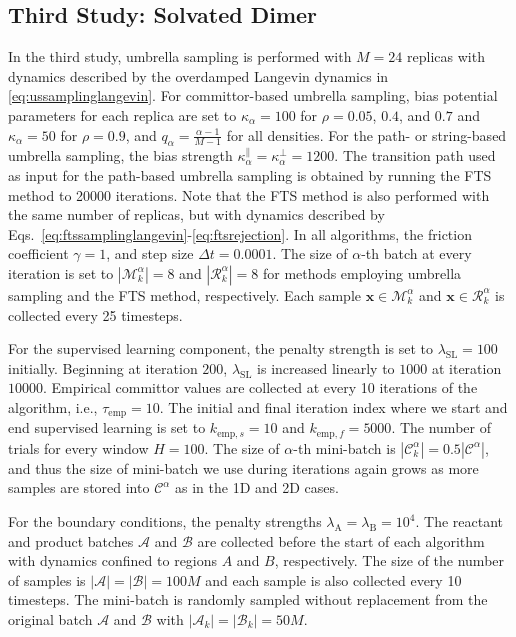 \documentclass{article}
\numberwithin{equation}{section}
\def\*#1{\mathbf{#1}}
\theoremstyle{definition}
\theoremstyle{remark}
\begin{document}
\subsection{Third Study: Solvated Dimer} \label{app:optimizer_dimer}

In the third study, umbrella sampling is performed with $M=24$ replicas with dynamics described by the overdamped Langevin dynamics in \cref{eq:ussamplinglangevin}.
For committor-based umbrella sampling, bias potential parameters for each replica are set to $\kappa_\alpha= 100$ for $ \rho = 0.05 $, $ 0.4 $, and $ 0.7 $ and $\kappa_\alpha = 50$ for $ \rho = 0.9$,  and $q_\alpha = \frac{\alpha-1}{M-1}$ for all densities. 
For the path- or string-based umbrella sampling, the bias strength $\kappa_\alpha^\parallel=\kappa_\alpha^\bot=1200$.
The transition path used as input for the path-based umbrella sampling is obtained by running the FTS method to 20000 iterations.
Note that the FTS method is also performed with the same number of replicas, but with dynamics described by Eqs.~\eqref{eq:ftssamplinglangevin}-\eqref{eq:ftsrejection}. 
In all algorithms, the friction coefficient $\gamma=1$, and step size $\Delta t = 0.0001$. 
The size of $\alpha$-th batch at every iteration is set to $|\mathcal{M}_k^\alpha|=8$ and $|\mathcal{R}_k^\alpha|=8$ for methods employing umbrella sampling and the FTS method, respectively. 
Each sample $\* x \in \mathcal{M}_k^\alpha$ and $\* x \in \mathcal{R}_k^\alpha$ is collected every 25 timesteps.

For the supervised learning component, the penalty strength is set to $\lambda_\mathrm{SL} = 100$ initially.
Beginning at iteration $ 200 $, $ \lambda_\mathrm{SL} $ is increased linearly to $ 1000 $ at iteration $ 10000 $.
Empirical committor values are collected at every 10 iterations of the algorithm, i.e., $\tau_\mathrm{emp} = 10$.
The initial and final iteration index where we start and end supervised learning is set to $k_{\mathrm{emp},s}=10$ and $k_{\mathrm{emp},f}=5000$.  
The number of trials for every window $H = 100$. 
The size of $\alpha$-th mini-batch is $|\mathcal{C}_k^\alpha| = 0.5 |\mathcal{C}^\alpha|$, and thus the size of mini-batch we use during iterations again grows as more samples are stored into $\mathcal{C}^\alpha$ as in the 1D and 2D cases.

For the boundary conditions, the penalty strengths $\lambda_\mathrm{A}=\lambda_\mathrm{B}=10^4$. 
The reactant and product batches $\mathcal{A}$ and $\mathcal{B}$ are collected before the start of each algorithm with dynamics confined to regions $A$ and $B$, respectively. The size of the number of samples is $|\mathcal{A}|=|\mathcal{B}|=100M$ and each sample is also collected every 10 timesteps. The mini-batch is randomly sampled without replacement from the original batch $\mathcal{A}$ and $\mathcal{B}$ with $|\mathcal{A}_k|=|\mathcal{B}_k|=50M$. 
\end{document}

